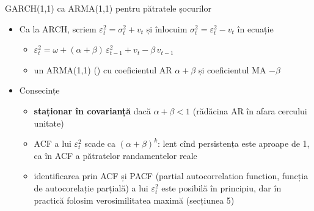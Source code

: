 \begin{frame}{GARCH(1,1) ca ARMA(1,1) pentru pătratele șocurilor}
\itemsize{\small}
\begin{itemize}
    \item Ca la ARCH, scriem $\varepsilon_t^2 = \sigma_t^2 + v_t$ și înlocuim $\sigma_t^2 = \varepsilon_t^2 - v_t$ în ecuație
    \begin{itemize}
        \item $\varepsilon_t^2 = \omega + (\alpha + \beta)\,\varepsilon_{t-1}^2 + v_t - \beta\,v_{t-1}$
        \item un ARMA(1,1) () cu coeficientul AR $\alpha + \beta$ și coeficientul MA $-\beta$
    \end{itemize}
    \item Consecințe
    \begin{itemize}
        \item \textbf{staționar în covarianță} dacă $\alpha + \beta < 1$ (rădăcina AR în afara cercului unitate)
        \item ACF a lui $\varepsilon_t^2$ scade ca $(\alpha + \beta)^k$: lent cînd persistența este aproape de 1, ca în ACF a pătratelor randamentelor reale
        \item identificarea prin ACF și PACF (partial autocorrelation function, funcția de autocorelație parțială) a lui $\varepsilon_t^2$ este posibilă în principiu, dar în practică folosim verosimilitatea maximă (secțiunea 5)
    \end{itemize}
\end{itemize}
\end{frame}

